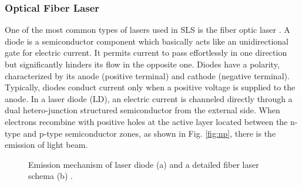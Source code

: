 \subsubsection{Optical Fiber Laser}
\label{sssec:fiberlaser}
One of the most common types of lasers used in SLS is the fiber optic laser \cite{milewski_additive_2017}. A diode is a semiconductor component which basically acts like an unidirectional gate for electric current. It permits current to pass effortlessly in one direction but significantly hinders its flow in the opposite one. Diodes have a polarity, characterized by its anode (positive terminal) and cathode (negative terminal). Typically, diodes conduct current only when a positive voltage is supplied to the anode. In a laser diode (LD), an electric current is channeled directly through a dual hetero-junction structured semiconductor from the external side. When electrons recombine with positive holes at the active layer located between the n-type and p-type semiconductor zones, as shown in Fig. \ref{fig:np}, there is the emission of light beam.
\begin{figure}
    \centering
    \qquad
    \caption[Laser diode and fiber laser.]{Emission mechanism of laser diode (a) and a detailed fiber laser schema (b) \cite{katayama_fundamentals_2020}.}
    
\end{figure}

